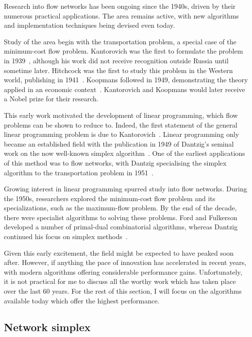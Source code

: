 Research into flow networks has been ongoing since the 1940s, driven by their numerous practical applications. The area remains active, with new algorithms and implementation techniques being devised even today.

Study of the area begin with the transportation problem, a special case of the minimum-cost flow problem. Kantorovich was the first to formulate the problem in 1939~\cite{Kantorovich:1960}, although his work did not receive recognition outside Russia until sometime later. Hitchcock was the first to study this problem in the Western world, publishing in 1941~\cite{Hitchcock:1941}. Koopmans followed in 1949, demonstrating the theory applied in an economic context~\cite{Koopmans:1949}. Kantorovich and Koopmans would later receive a Nobel prize for their research\footnotemark.

This early work motivated the development of linear programming, which flow problems can be shown to reduce to. Indeed, the first statement of the general linear programming problem is due to Kantorovich~\cite{Kantorovich:1960}. Linear programming only became an established field with the publication in 1949 of Dantzig's seminal work on the now well-known simplex algorithm~\cite{Dantzig:1949}. One of the earliest applications of this method was to flow networks, with Dantzig specialising the simplex algorithm to the transportation problem in 1951~\cite{Dantzig:1951}.

Growing interest in linear programming spurred study into flow networks. During the 1950s, researchers explored the minimum-cost flow problem and its specializations, such as the maximum-flow problem. By the end of the decade, there were specialist algorithms to solving these problems. Ford and Fulkerson developed a number of primal-dual combinatorial algorithms, whereas Dantzig continued his focus on simplex methods~\cite{FordFulkerson:1962,Dantzig:1962}.

Given this early excitement, the field might be expected to have peaked soon after. However, if anything the pace of innovation has accelerated in recent years, with modern algorithms offering considerable performance gains. Unfortunately, it is not practical for me to discuss all the worthy work which has taken place over the last 60 years. For the rest of this section, I will focus on the algorithms available today which offer the highest performance.

\subsection{Network simplex}


